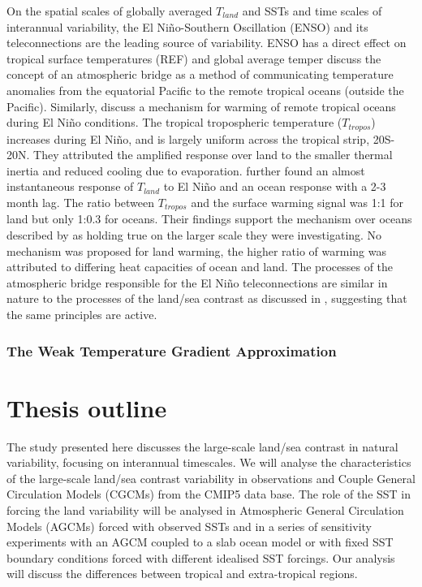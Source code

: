 On the spatial scales of globally averaged $T_{land}$ and SSTs and time scales 
of interannual variability, the El Ni{\~n}o-Southern Oscillation (ENSO) and its 
teleconnections are the leading source of variability. ENSO has a direct effect 
on tropical surface temperatures (REF) and global average temper
\citet{Klein1999} discuss the concept of an atmospheric bridge as a method of 
communicating temperature anomalies from the equatorial Pacific to the remote 
tropical oceans (outside the Pacific).  Similarly, \citet{Chiang2002} discuss a 
mechanism for warming of remote tropical oceans during El Ni{\~n}o conditions.  
The tropical tropospheric temperature ($T_{tropos}$) increases during El 
Ni{\~n}o, and is largely uniform across the tropical strip, 20S-20N.  They 
attributed the amplified response over land to the smaller thermal inertia and 
reduced cooling due to evaporation.  \citet{Chiang2005} further found an almost 
instantaneous response of $T_{land}$ to  El Ni{\~n}o and an ocean response with 
a 2-3 month lag.  The ratio between $T_{tropos}$ and the surface warming signal 
was 1:1 for land but only 1:0.3 for oceans.  Their findings support the 
mechanism over oceans described by \citet{Chiang2002} as holding true on the 
larger scale they were investigating.  No mechanism was proposed for land 
warming, the higher ratio of warming was attributed to differing heat capacities 
of ocean and land.  The processes of the atmospheric bridge responsible for the 
El Ni{\~n}o teleconnections are similar in nature to the processes of the 
land/sea contrast as discussed in \citet{Joshi2008}, suggesting that the same 
principles are active.

\subsubsection{The Weak Temperature Gradient Approximation}\label{sssec:wtg}


\section{Thesis outline}

The study presented here discusses the large-scale land/sea contrast in natural 
variability, focusing on interannual timescales. We will analyse the 
characteristics of the large-scale land/sea contrast variability in observations 
and Couple General Circulation Models (CGCMs) from the CMIP5 data base. The role 
of the SST in forcing the land variability will be analysed in Atmospheric 
General Circulation Models (AGCMs) forced with observed SSTs and in a series of 
sensitivity experiments with an AGCM coupled to a slab ocean model or with fixed 
SST boundary conditions forced with different idealised SST forcings.  Our 
analysis will discuss the differences between tropical and extra-tropical 
regions.

